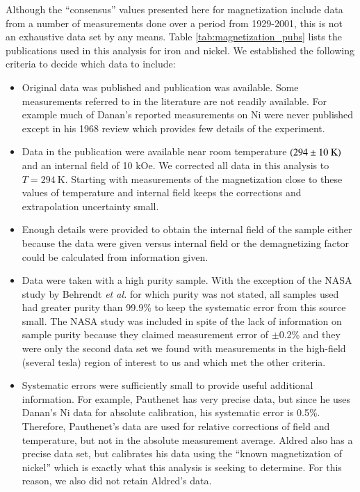 \documentclass[preprint,12pt]{elsarticle}
\begin{document}
Although the ``consensus'' values presented here for magnetization include data from a number of measurements done over a period from 1929-2001, this is not an exhaustive data set by any means. Table \ref{tab:magnetization_pubs} lists the publications used in this analysis for iron and nickel. We established the following criteria to decide which data to include:
\begin{itemize}
\item{Original data was published and publication was available. Some measurements referred to in the literature are not readily available. For example much of Danan's reported measurements on Ni were never published except in his 1968 review which provides few details of the experiment. }
\item{Data in the publication were available near room temperature $(294\pm10~\rm{K})$ and an internal field of 10 kOe. We corrected all data in this analysis to $T=294~$K. Starting with measurements of the magnetization close to these values of temperature and internal field keeps the corrections and extrapolation uncertainty small.}
\item{Enough details were provided to obtain the internal field of the sample either because the data were given versus internal field or the demagnetizing factor could be calculated from information given.}
\item{Data were taken with a high purity sample. With the exception of the NASA study by Behrendt {\it et al.} for which purity was not stated, all samples used had greater purity than 99.9\% to keep the systematic error from this source small. The NASA study was included in spite of the lack of information on sample purity because they claimed measurement error of $\pm$0.2\% and they were only the second data set we found with measurements in the high-field (several tesla) region of interest to us and which met the other criteria.}
\item{Systematic errors were sufficiently small to provide useful additional information. For example, Pauthenet \cite{PauthenetMar1982} has very precise data, but since he uses Danan's Ni data for absolute calibration, his systematic error is 0.5\%. Therefore, Pauthenet's data are used for relative corrections of field and temperature, but not in the absolute measurement average. Aldred \cite{Aldred1975} also has a precise data set, but calibrates his data using the ``known magnetization of nickel'' which is exactly what this analysis is seeking to determine. For this reason, we also did not retain Aldred's data.} 
\end{itemize}
\end{document}
